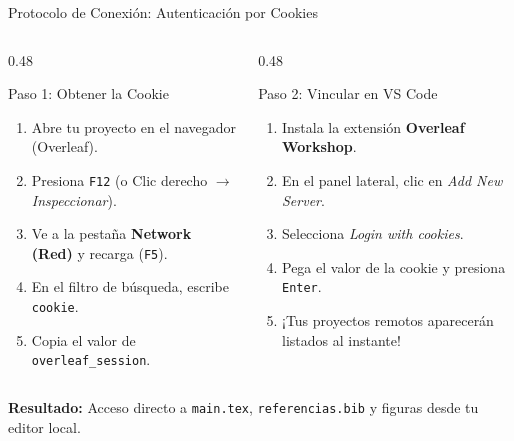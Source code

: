 \documentclass[aspectratio=169, 10pt]{beamer}
\begin{document}
\begin{frame}{Protocolo de Conexión: Autenticación por Cookies}
  \begin{columns}[T]
    \begin{column}{0.48\textwidth}
      \begin{block}{Paso 1: Obtener la Cookie}
        \begin{enumerate}\scriptsize
          \item Abre tu proyecto en el navegador (Overleaf).
          \item Presiona \texttt{F12} (o Clic derecho $\to$ \textit{Inspeccionar}).
          \item Ve a la pestaña \textbf{Network (Red)} y recarga (\texttt{F5}).
          \item En el filtro de búsqueda, escribe \texttt{cookie}.
          \item Copia el valor de \texttt{overleaf\_session}.
        \end{enumerate}
      \end{block}
    \end{column}

    \begin{column}{0.48\textwidth}
      \begin{block}{Paso 2: Vincular en VS Code}
        \begin{enumerate}\scriptsize
          \item Instala la extensión \textbf{Overleaf Workshop}.
          \item En el panel lateral, clic en \textit{Add New Server}.
          \item Selecciona \textit{Login with cookies}.
          \item Pega el valor de la cookie y presiona \texttt{Enter}.
          \item ¡Tus proyectos remotos aparecerán listados al instante!
        \end{enumerate}
      \end{block}
    \end{column}
  \end{columns}

  \vspace{0.15cm}
  \begin{tcolorbox}[colback=accentGreen!10,colframe=accentGreen,boxrule=0.5pt,arc=1.5mm,halign=center,top=1.5mm,bottom=1.5mm]
    \footnotesize\textbf{Resultado:} Acceso directo a \texttt{main.tex}, \texttt{referencias.bib} y figuras desde tu editor local.
  \end{tcolorbox}
\end{frame}
\end{document}
